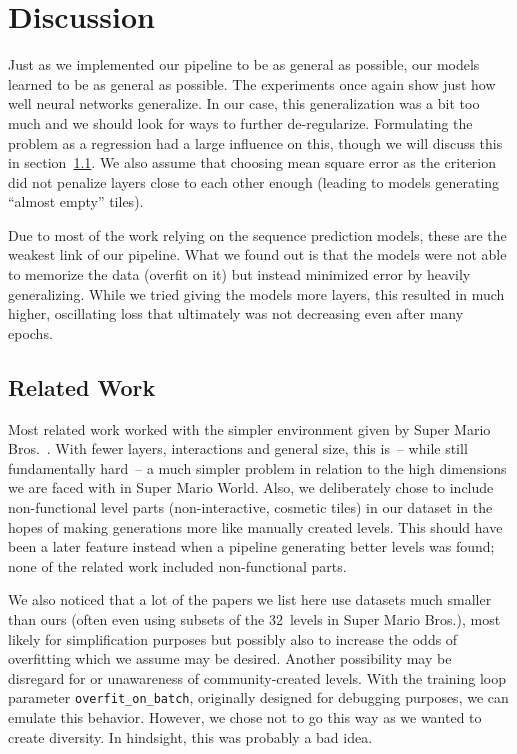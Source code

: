 \section{Discussion}

Just as we implemented our pipeline to be as general as possible, our
models learned to be as general as possible. The experiments once
again show just how well neural networks generalize. In our case, this
generalization was a bit too much and we should look for ways to
further de-regularize. Formulating the problem as a regression had a
large influence on this, though we will discuss this in
section~\ref{sec:related-work}. We also assume that choosing mean
square error as the criterion did not penalize layers close to each
other enough (leading to models generating ``almost empty'' tiles).

Due to most of the work relying on the sequence prediction models,
these are the weakest link of our pipeline. What we found out is that
the models were not able to memorize the data (overfit on it) but
instead minimized error by heavily generalizing. While we tried giving
the models more layers, this resulted in much higher, oscillating loss
that ultimately was not decreasing even after many epochs.

\subsection{Related Work}
\label{sec:related-work}

Most related work worked with the simpler environment given by Super
Mario Bros.~\cite{SuperMarioBros2019}. With fewer layers, interactions
and general size, this is~-- while still fundamentally hard~-- a much
simpler problem in relation to the high dimensions we are faced with
in Super Mario World. Also, we deliberately chose to include
non-functional level parts (non-interactive, cosmetic tiles) in our
dataset in the hopes of making generations more like manually created
levels. This should have been a later feature instead when a pipeline
generating better levels was found; none of the related work included
non-functional parts.

We also noticed that a lot of the papers we list here use datasets
much smaller than ours (often even using subsets of the 32~levels in
Super Mario Bros.), most likely for simplification purposes but
possibly also to increase the odds of overfitting which we assume may
be desired. Another possibility may be disregard for or unawareness of
community-created levels. With the training loop parameter
\texttt{overfit\_on\_batch}, originally designed for debugging
purposes, we can emulate this behavior. However, we chose not to go
this way as we wanted to create diversity. In hindsight, this was
probably a bad idea.

